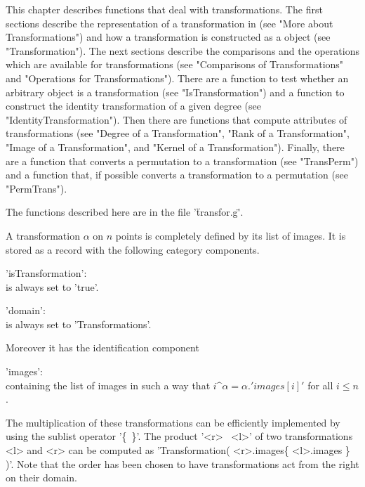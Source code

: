 This  chapter  describes functions that  deal  with transformations.  The
first sections describe the representation  of a transformation in {\GAP}
(see  "More  about   Transformations")   and   how a  transformation   is
constructed as a {\GAP} object (see "Transformation").  The next sections
describe  the comparisons and  the   operations which are available   for
transformations (see "Comparisons of Transformations" and "Operations for
Transformations").   There are a  function  to test  whether an arbitrary
object  is  a transformation (see "IsTransformation")  and  a function to
construct  the   identity    transformation   of a   given   degree  (see
"IdentityTransformation").   Then   there  are   functions   that compute
attributes of transformations (see "Degree of a Transformation", "Rank of
a  Transformation",   "Image of a   Transformation",  and  "Kernel  of  a
Transformation").   Finally,   there   are a  function    that converts a
permutation to a transformation (see "TransPerm") and a function that, if
possible converts a transformation to a permutation (see "PermTrans").

The functions described here are in the file '\"transfor.g\"'.


A transformation $\alpha$ on $n$ points is completely defined by its list
of images.   It   is stored as  a  record  with   the  following category
components.

'isTransformation': \\
        is always set to 'true'.

'domain': \\
        is always set to 'Transformations'.

Moreover it has the identification component

'images':\\
        containing  the list of  images in  such a way that  $i\^\alpha =
        \alpha.'images[i]'$ for all $i \leq n$.

The multiplication    of  these   transformations   can  be   efficiently
implemented by using the sublist operator '\{\ \}'.  The product '<r> \*\ 
<l>'  of    two  transformations  <l>   and   <r>  can  be   computed  as
'Transformation( <r>.images\{ <l>.images \}  )'.  Note that the order has
been chosen to have transformations act from the right on their domain.

\Section{Transformation}

